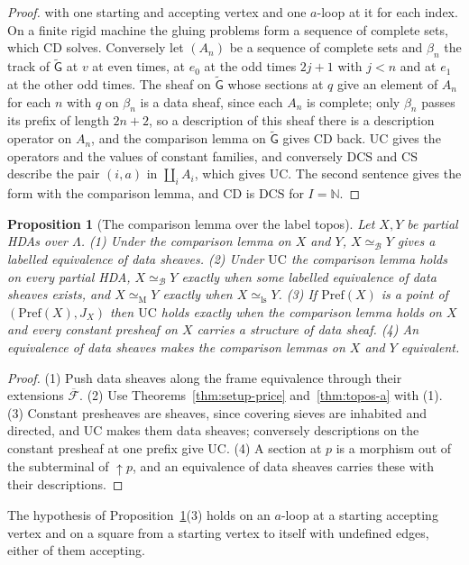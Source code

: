 \documentclass{lmcs}
\newtheorem{proposition}[theorem]{Proposition}
\theoremstyle{definition}
\theoremstyle{remark}
\newcommand{\Nn}{\mathbb{N}}
\newcommand{\prin}[1]{\mathrm{#1}}
\newcommand{\UC}{\prin{UC}}
\newcommand{\CD}{\prin{CD}}
\newcommand{\Pref}{\mathrm{Pref}}
\newcommand{\JX}[1]{J_{#1}}
\newcommand{\upc}[1]{{\uparrow}#1}
\newcommand{\eqM}{\simeq_{\mathrm{M}}}
\newcommand{\eqLs}{\simeq_{\mathrm{ls}}}
\newcommand{\Ext}[1]{\overline{#1}}
\providecommand{\eqB}{\simeq_{\mathcal{B}}}
\providecommand{\CS}{\prin{CS}}
\providecommand{\DCS}{\prin{DCS}}
\providecommand{\wGt}{\tilde{\mathsf{G}}}
\begin{document}
\begin{proof}
with one starting and accepting vertex and one $a$-loop at it for each
index. On a finite
rigid machine the gluing problems form a sequence of complete sets, which $\CD$ solves.
Conversely let $(A_n)$ be a sequence of complete sets and $\beta_n$ the track of $\wGt$ at $v$ at even times, at $e_0$
at the odd times $2j+1$ with $j<n$ and at $e_1$ at the other odd times. The sheaf on
$\wGt$ whose sections at $q$ give an element of $A_n$ for each $n$ with $q$ on $\beta_n$ is a data sheaf, since each
$A_n$ is complete; only $\beta_n$ passes its prefix of length
$2n+2$, so a description of this sheaf there is a description operator on $A_n$, and the
comparison lemma on $\wGt$ gives $\CD$
back. $\UC$ gives
the operators and the values of constant families, and
conversely $\DCS$ and $\CS$ describe the pair $(i,a)$ in $\coprod_iA_i$, which gives
$\UC$.
The second sentence gives the form with the comparison lemma, and $\CD$ is $\DCS$ for $I=\Nn$.
\end{proof}

\begin{proposition}[The comparison lemma over the label topos]\label{prop:prices-glue}
Let $X,Y$ be partial HDAs over $\Lambda$.
(1) Under the comparison lemma on $X$ and $Y$, $X\eqB Y$ gives a labelled equivalence of data
sheaves.
(2) Under $\UC$ the comparison lemma holds on every partial HDA, $X\eqB Y$
exactly when some labelled equivalence of data sheaves exists, and $X\eqM Y$ exactly when
$X\eqLs Y$.
(3) If $\Pref(X)$ is a point of $(\Pref(X),\JX{X})$ then $\UC$ holds exactly when the
comparison lemma holds on $X$ and every constant presheaf on $X$ carries a structure of data
sheaf.
(4) An equivalence of data sheaves makes the comparison lemmas on $X$ and $Y$
equivalent.
\end{proposition}

\begin{proof}
(1) Push data sheaves along the frame equivalence through their extensions
$\Ext{\mathscr{F}}$. (2) Use
Theorems~\ref{thm:setup-price} and~\ref{thm:topos-a} with (1).
(3) Constant presheaves are sheaves, since covering sieves are inhabited and directed, and $\UC$
makes them data sheaves; conversely descriptions on the
constant presheaf at one prefix give
$\UC$. (4) A section at
$p$ is a morphism out of the subterminal of $\upc{p}$, and an equivalence of data sheaves carries these with
their descriptions.
\end{proof}

The hypothesis of Proposition~\ref{prop:prices-glue}(3) holds on an $a$-loop at a
starting accepting vertex and on a square from a starting vertex to itself with
undefined edges, either of them accepting.
\end{document}
